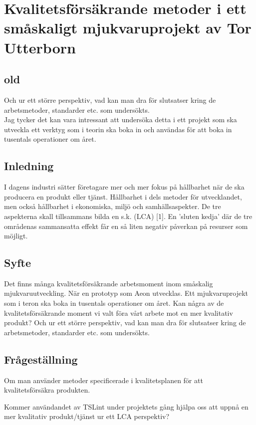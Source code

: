 \chapter{Kvalitetsförsäkrande metoder i ett småskaligt mjukvaruprojekt av Tor Utterborn}

\section{old}

Och ur ett större perspektiv, vad kan man dra för slutsatser kring de arbetsmetoder, standarder etc. som undersökts. \\

Jag tycker det kan vara intressant att undersöka detta i ett projekt som ska utveckla ett verktyg som i teorin ska boka in och användas för att boka in tusentals operationer om året.

\section{Inledning}
I dagens industri sätter företagare mer och mer fokus på hållbarhet när de ska producera en produkt eller tjänst. Hållbarhet i dels metoder för utvecklandet, men också hållbarhet i ekonomiska, miljö och samhällsaspekter.
De tre aspekterna skall tillsammans bilda en s.k. (LCA) [1]. En ’sluten kedja’ där de tre områdenas sammansatta effekt får en så liten negativ påverkan på resurser som möjligt.

\section{Syfte}
Det finns många kvalitetsförsäkrande arbetsmoment inom småskalig mjukvaruutveckling. När en prototyp som Aeon utvecklas. Ett mjukvaruprojekt som i teron ska boka in tusentals operationer om året. Kan några av de kvalitetsförsäkrande moment vi valt föra vårt arbete mot en mer kvalitativ produkt? Och ur ett större perspektiv, vad kan man dra för slutsatser kring de arbetsmetoder, standarder etc. som undersökts.

\section{Frågeställning}

Om man använder metoder specificerade i kvalitetsplanen för att kvalitetsförsäkra produkten. 

Kommer användandet av TSLint under projektets gång hjälpa oss att uppnå en mer kvalitativ produkt/tjänst ur ett LCA perspektiv?

